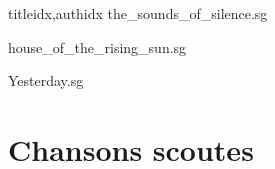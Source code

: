 \documentclass[12pt]{article}
\begin{document}
\begin{songs}{titleidx,authidx}
{the_sounds_of_silence.sg}


{house_of_the_rising_sun.sg}


{Yesterday.sg}

\end{songs}

\part*{Chansons scoutes}
\end{document}

